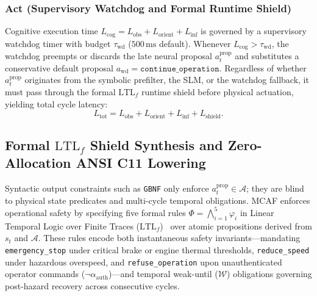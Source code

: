 \documentclass{ieeeaccess}
\begin{document}
\subsubsection{Act (Supervisory Watchdog and Formal Runtime Shield)}
Cognitive execution time $L_{\mathrm{cog}} = L_{\mathrm{obs}} + L_{\mathrm{orient}} + L_{\mathrm{inf}}$ is governed by a supervisory watchdog timer with budget $\tau_{\mathrm{wd}}$ ($500\,\text{ms}$ default). Whenever $L_{\mathrm{cog}} > \tau_{\mathrm{wd}}$, the watchdog preempts or discards the late neural proposal $a_t^{\mathrm{prop}}$ and substitutes a conservative default proposal $a_{\mathrm{wd}} = \texttt{continue\_operation}$. Regardless of whether $a_t^{\mathrm{prop}}$ originates from the symbolic prefilter, the SLM, or the watchdog fallback, it must pass through the formal $\mathrm{LTL}_f$ runtime shield before physical actuation, yielding total cycle latency:
\begin{equation}
    L_{\mathrm{tot}} = L_{\mathrm{obs}} + L_{\mathrm{orient}} + L_{\mathrm{inf}} + L_{\mathrm{shield}}.
    \label{eq:latency_decomp}
\end{equation}

\subsection{Formal $\mathrm{LTL}_f$ Shield Synthesis and Zero-Allocation ANSI C11 Lowering}
Syntactic output constraints such as \texttt{GBNF} only enforce $a_t^{\mathrm{prop}} \in \mathcal{A}$; they are blind to physical state predicates and multi-cycle temporal obligations. MCAF enforces operational safety by specifying five formal rules $\Phi = \bigwedge_{i=1}^{5} \varphi_i$ in Linear Temporal Logic over Finite Traces ($\mathrm{LTL}_f$)~\cite{degiacomo2013ltlf} over atomic propositions derived from $s_t$ and $\mathcal{A}$. These rules encode both instantaneous safety invariants---mandating \texttt{emergency\_stop} under critical brake or engine thermal thresholds, \texttt{reduce\_speed} under hazardous overspeed, and \texttt{refuse\_operation} upon unauthenticated operator commands ($\neg \alpha_{\mathrm{auth}}$)---and temporal weak-until ($\mathcal{W}$) obligations governing post-hazard recovery across consecutive cycles.
\end{document}
